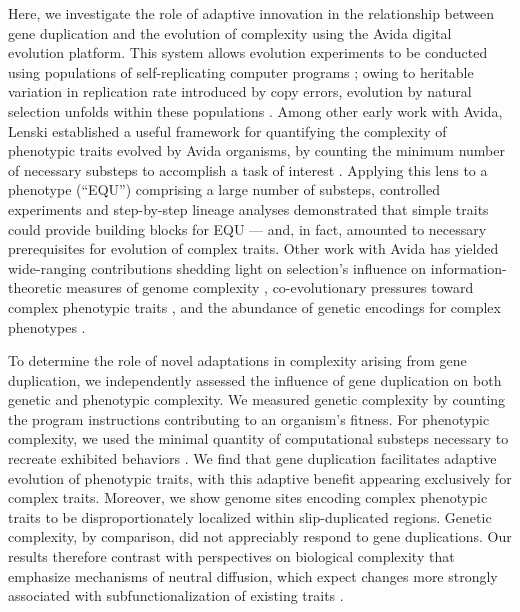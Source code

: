 Here, we investigate the role of adaptive innovation in the relationship between gene duplication and the evolution of complexity using the Avida digital evolution platform.
This system allows evolution experiments to be conducted using populations of self-replicating computer programs \citep{Ofria:2009avida};
owing to heritable variation in replication rate introduced by copy errors, evolution by natural selection unfolds within these populations \citep{pennock2007models}.
Among other early work with Avida, Lenski established a useful framework for quantifying the complexity of phenotypic traits evolved by Avida organisms, by counting the minimum number of necessary substeps to accomplish a task of interest \citet{lenski2003evolutionary}.
Applying this lens to a phenotype  (``EQU'') comprising a large number of substeps, controlled experiments and step-by-step lineage analyses demonstrated that simple traits could provide building blocks for EQU --- and, in fact, amounted to necessary prerequisites for evolution of complex traits.
Other work with Avida has yielded wide-ranging contributions shedding light on selection's influence on information-theoretic measures of genome complexity \citep{Adami2000Evolution}, co-evolutionary pressures toward complex phenotypic traits \citep{Zaman2014Coevolution}, and the abundance of genetic encodings for complex phenotypes \citep{Fortuna2017GenotypePhenotype}.

To determine the role of novel adaptations in complexity arising from gene duplication, we independently assessed the influence of gene duplication on both genetic and phenotypic complexity.
We measured genetic complexity by counting the program instructions contributing to an organism's fitness.
For phenotypic complexity, we used the minimal quantity of computational substeps necessary to recreate exhibited behaviors \citet{lenski2003evolutionary}.
We find that gene duplication facilitates adaptive evolution of phenotypic traits, with this adaptive benefit appearing exclusively for complex traits.
Moreover, we show genome sites encoding complex phenotypic traits to be disproportionately localized within slip-duplicated regions.
Genetic complexity, by comparison, did not appreciably respond to gene duplications.
Our results therefore contrast with perspectives on biological complexity that emphasize mechanisms of neutral diffusion, which expect changes more strongly associated with subfunctionalization of existing traits \citep{TODO}.



